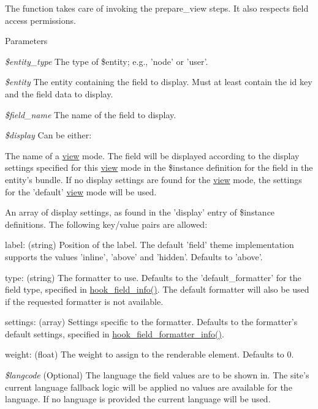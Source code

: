 The function takes care of invoking the prepare\_\-view steps. It also respects field access permissions.


\begin{DoxyParams}{Parameters}
\item[{\em \$entity\_\-type}]The type of \$entity; e.g., 'node' or 'user'. \item[{\em \$entity}]The entity containing the field to display. Must at least contain the id key and the field data to display. \item[{\em \$field\_\-name}]The name of the field to display. \item[{\em \$display}]Can be either:
\begin{DoxyItemize}
\item The name of a \hyperlink{classview}{view} mode. The field will be displayed according to the display settings specified for this \hyperlink{classview}{view} mode in the \$instance definition for the field in the entity's bundle. If no display settings are found for the \hyperlink{classview}{view} mode, the settings for the 'default' \hyperlink{classview}{view} mode will be used.
\item An array of display settings, as found in the 'display' entry of \$instance definitions. The following key/value pairs are allowed:
\begin{DoxyItemize}
\item label: (string) Position of the label. The default 'field' theme implementation supports the values 'inline', 'above' and 'hidden'. Defaults to 'above'.
\item type: (string) The formatter to use. Defaults to the 'default\_\-formatter' for the field type, specified in \hyperlink{group__field__types_gad3eb779f26f41b520f19af011ece3eb1}{hook\_\-field\_\-info()}. The default formatter will also be used if the requested formatter is not available.
\item settings: (array) Settings specific to the formatter. Defaults to the formatter's default settings, specified in \hyperlink{group__field__formatter_ga2f5aa1c7455f55dffd84a48efa57f987}{hook\_\-field\_\-formatter\_\-info()}.
\item weight: (float) The weight to assign to the renderable element. Defaults to 0. 
\end{DoxyItemize}
\end{DoxyItemize}\item[{\em \$langcode}](Optional) The language the field values are to be shown in. The site's current language fallback logic will be applied no values are available for the language. If no language is provided the current language will be used. \end{DoxyParams}

